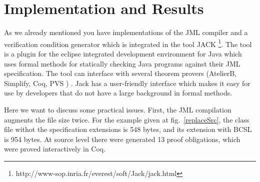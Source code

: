\section{Implementation and Results}
 As we already mentioned you have implementations of the JML compiler and a verification condition generator which is integrated in the tool JACK \footnote{ http://www-sop.inria.fr/everest/soft/Jack/jack.html}.
 The tool is a plugin for the eclipse  integrated development environment for Java which uses formal methods for
statically checking Java programs against their JML specification. The tool can interface with several theorem provers (AtelierB, 
Simplify, Coq, PVS ) . Jack has a user-friendly interface which makes it easy for use by developers that do not have
a large background in formal methods.

Here we want to discuss some practical issues. First, the JML compilation augments the file size twice. For the example given at fig.~\ref{replaceSrc}, the class 
file withot the specification extensions is 548 bytes, and its extension with BCSL is 954 bytes. At source level there were generated 13 proof obligations, which 
were proved interactively in Coq. 
